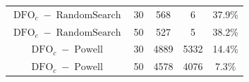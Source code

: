 \begin{table}[htb]
\begin{center}
\begin{tabular}{cc|cc|c}
$\operatorname{DFO}_c-\operatorname{RandomSearch}$  &30&	568	&6	&37.9\%\\
$\operatorname{DFO}_c-\operatorname{RandomSearch}$ &50&	527	&5&	38.2\%\\
\hline
$\operatorname{DFO}_c-\operatorname{Powell}$ &30&	4889&	5332&	14.4\%\\
$\operatorname{DFO}_c-\operatorname{Powell}$ &50&	4578	&4076&	7.3\%\\



\end{tabular}
\end{center}
\end{table}

